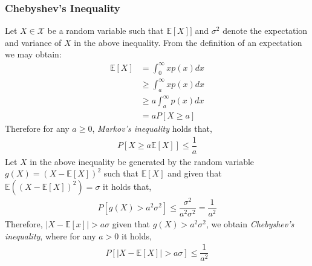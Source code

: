 \documentclass[12pt]{article}
\begin{document}
			\subsubsection{Chebyshev's Inequality}
		Let $X \in \mathcal{X}$ be a random variable such that $ \mathbb{E}  [X]]$ and $\sigma^2$ denote the expectation and variance of ${X}$ in the above inequality.  From the definition of an expectation we may obtain:
		\begin{equation}
			\begin{split}
			\mathbb{E} [ X ] & = \int_{0}^{\infty} x p(x) dx  \\
			& \geq   \int_{a}^{\infty} x p(x) dx  \\
			& \geq a  \int_{a}^{\infty} p(x) dx \\
			& = a P[X\geq a]
			\end{split}
		\end{equation}
		Therefore for any $a \geq 0$, \emph{Markov's inequality} holds that,
		\begin{equation}
			\begin{split}
				P[X\geq a \mathbb{E}  [X]] \leq \dfrac{1}{a}
			\end{split}
		\end{equation}
		Let $X$ in the above inequality be generated by the random variable $g(X) = (X - \mathbb{E}  [X])^2$ such that $ \mathbb{E} [X]$ and given that $  \mathbb{E} ((X - \mathbb{E}  [X])^2) = \sigma$ it holds that, 
				\begin{equation}
			\begin{split}
				P[g(X) > a^2 \sigma^2 ] \leq \dfrac{\sigma^2}{a^2 \sigma^2} = \dfrac{1}{a^2}
			\end{split}
		\end{equation}
		Therefore, $|X - \mathbb{E}[x]| > a \sigma$ given that $g(X) > a^2 \sigma^2$, we obtain  \emph{Chebyshev's inequality}, where for any $a>0$ it holds, 
						\begin{equation}
			\begin{split}
				P[|X - \mathbb{E}[X]| > a \sigma ] \leq  \dfrac{1}{a^2}
			\end{split}
		\end{equation}
\end{document}
